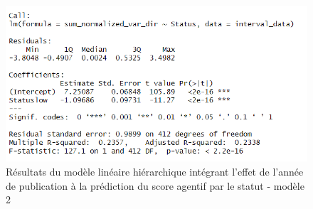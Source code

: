 \begin{figure}[!ht]
    \centering
    \includegraphics[width=12cm]{img/lmer2.png}
    \caption{Résultats du modèle linéaire hiérarchique intégrant l'effet de l'année de publication à la prédiction du score agentif par le statut - modèle 2}
    \label{lmer2}
\end{figure}